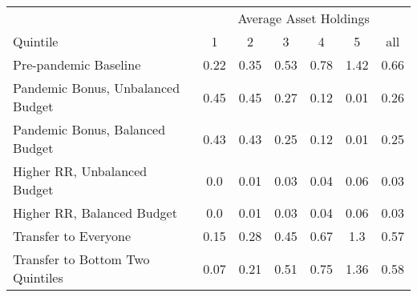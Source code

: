 \begin{center}
\begin{adjustbox}{width=\textwidth}
\begin{tabular}{lcccccc}\toprule
 & \multicolumn{6}{c}{Average Asset Holdings} \\
\cline{2-7}
Quintile & 1 & 2 & 3 & 4 & 5 & all \\
\midrule
Pre-pandemic Baseline & 0.22 & 0.35 & 0.53 & 0.78 & 1.42 & 0.66 \\
Pandemic Bonus, Unbalanced Budget & 0.45 & 0.45 & 0.27 & 0.12 & 0.01 & 0.26 \\
Pandemic Bonus, Balanced Budget & 0.43 & 0.43 & 0.25 & 0.12 & 0.01 & 0.25 \\
Higher RR, Unbalanced Budget & 0.0 & 0.01 & 0.03 & 0.04 & 0.06 & 0.03 \\
Higher RR, Balanced Budget & 0.0 & 0.01 & 0.03 & 0.04 & 0.06 & 0.03 \\
Transfer to Everyone & 0.15 & 0.28 & 0.45 & 0.67 & 1.3 & 0.57 \\
Transfer to Bottom Two Quintiles & 0.07 & 0.21 & 0.51 & 0.75 & 1.36 & 0.58 \\
\bottomrule\end{tabular}
\end{adjustbox}
\end{center}